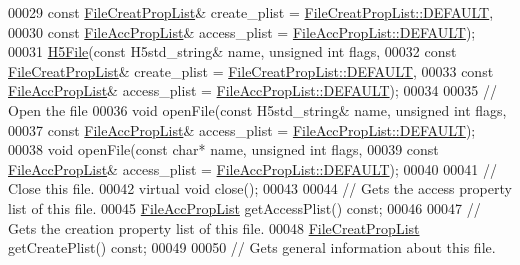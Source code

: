 \begin{DoxyCode}
00029            \textcolor{keyword}{const} \hyperlink{class_h5_1_1_file_creat_prop_list}{FileCreatPropList}& create\_plist = 
      \hyperlink{class_h5_1_1_file_creat_prop_list_a4913710830a8ec38fbbda805074377d4}{FileCreatPropList::DEFAULT},
00030            \textcolor{keyword}{const} \hyperlink{class_h5_1_1_file_acc_prop_list}{FileAccPropList}& access\_plist = 
      \hyperlink{class_h5_1_1_file_acc_prop_list_a866e7c16e8840c67a194f3bef8501e48}{FileAccPropList::DEFAULT});
00031         \hyperlink{class_h5_1_1_h5_file}{H5File}(\textcolor{keyword}{const} H5std\_string& name, \textcolor{keywordtype}{unsigned} \textcolor{keywordtype}{int} flags,
00032            \textcolor{keyword}{const} \hyperlink{class_h5_1_1_file_creat_prop_list}{FileCreatPropList}& create\_plist = 
      \hyperlink{class_h5_1_1_file_creat_prop_list_a4913710830a8ec38fbbda805074377d4}{FileCreatPropList::DEFAULT},
00033            \textcolor{keyword}{const} \hyperlink{class_h5_1_1_file_acc_prop_list}{FileAccPropList}& access\_plist = 
      \hyperlink{class_h5_1_1_file_acc_prop_list_a866e7c16e8840c67a194f3bef8501e48}{FileAccPropList::DEFAULT});
00034 
00035         \textcolor{comment}{// Open the file}
00036         \textcolor{keywordtype}{void} openFile(\textcolor{keyword}{const} H5std\_string& name, \textcolor{keywordtype}{unsigned} \textcolor{keywordtype}{int} flags,
00037             \textcolor{keyword}{const} \hyperlink{class_h5_1_1_file_acc_prop_list}{FileAccPropList}& access\_plist = 
      \hyperlink{class_h5_1_1_file_acc_prop_list_a866e7c16e8840c67a194f3bef8501e48}{FileAccPropList::DEFAULT});
00038         \textcolor{keywordtype}{void} openFile(\textcolor{keyword}{const} \textcolor{keywordtype}{char}* name, \textcolor{keywordtype}{unsigned} \textcolor{keywordtype}{int} flags,
00039             \textcolor{keyword}{const} \hyperlink{class_h5_1_1_file_acc_prop_list}{FileAccPropList}& access\_plist = 
      \hyperlink{class_h5_1_1_file_acc_prop_list_a866e7c16e8840c67a194f3bef8501e48}{FileAccPropList::DEFAULT});
00040 
00041         \textcolor{comment}{// Close this file.}
00042         \textcolor{keyword}{virtual} \textcolor{keywordtype}{void} close();
00043 
00044         \textcolor{comment}{// Gets the access property list of this file.}
00045         \hyperlink{class_h5_1_1_file_acc_prop_list}{FileAccPropList} getAccessPlist() \textcolor{keyword}{const};
00046 
00047         \textcolor{comment}{// Gets the creation property list of this file.}
00048         \hyperlink{class_h5_1_1_file_creat_prop_list}{FileCreatPropList} getCreatePlist() \textcolor{keyword}{const};
00049 
00050         \textcolor{comment}{// Gets general information about this file.}

\end{DoxyCode}
